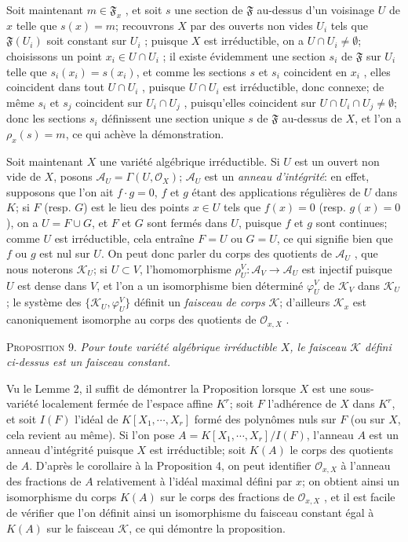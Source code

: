 Soit maintenant $m \in \mathfrak{F}_x$ , et soit $s$ une section de $\mathfrak{F}$ au-dessus d'un voisinage $U$ de $x$ telle que $s(x) = m$; recouvrons $X$ par des ouverts non vides $U_i$ tels que $\mathfrak{F}(U_i)$ soit constant sur $U_i$ ; puisque $X$ est irréductible, on a $U \cap U_i \neq \emptyset$; choisissons un point $x_i \in U \cap U_i$ ; il existe évidemment une section $s_i$ de $\mathfrak{F}$ sur $U_i$ telle que $s_i(x_i) = s(x_i)$, et comme les sections $s$ et $s_i$ coincident en $x_i$ , elles coincident dans tout $U \cap U_i$ , puisque $U \cap U_i$ est irréductible, donc connexe; de même $s_i$ et $s_j$ coincident sur $U_i \cap U_j$ , puisqu'elles coincident sur $U \cap U_i \cap U_j \neq \emptyset$; donc les sections $s_i$ définissent une section unique $s$ de $\mathfrak{F}$ au-dessus de $X$, et l'on a $\rho_x(s) = m$, ce qui achève la démonstration.

Soit maintenant $X$ une variété algébrique irréductible. Si $U$ est un ouvert non vide de $X$, posons $\mathcal{A}_U = \Gamma(U, \mathcal{O}_X)$; $\mathcal{A}_U$ est un \textit{anneau d'intégrité}: en effet, supposons que l'on ait $f \cdot g = 0$, $f$ et $g$ étant des applications régulières de $U$ dans $K$; si $F$ (resp. $G$) est le lieu des points $x \in U$ tels que $f(x) = 0$ (resp. $g(x) = 0$), on a $U = F \cup G$, et $F$ et $G$ sont fermés dans $U$, puisque $f$ et $g$ sont continues; comme $U$ est irréductible, cela entraîne $F = U$ ou $G = U$, ce qui signifie bien que $f$ ou $g$ est nul sur $U$. On peut donc parler du corps des quotients de $\mathcal{A}_U$ , que nous noterons $\mathcal{K}_U$; si $U \subset V$, l'homomorphisme $\rho_U^V\colon \mathcal{A}_V \to \mathcal{A}_U$ est injectif puisque $U$ est dense dans $V$, et l'on a un isomorphisme bien déterminé $\varphi_U^V$ de $\mathcal{K}_V$ dans $\mathcal{K}_U$ ; le système des $\{\mathcal{K}_U , \varphi_U^V\}$ définit un \textit{faisceau de corps} $\mathcal{K}$; d'ailleurs $\mathcal{K}_x$ est canoniquement isomorphe au corps des quotients de $\mathcal{O}_{x,X}$ .

\textsc{Proposition} 9. \textit{Pour toute variété algébrique irréductible $X$, le faisceau $\mathcal{K}$ défini ci-dessus est un faisceau constant.}

Vu le Lemme 2, il suffit de démontrer la Proposition lorsque $X$ est une sous-variété localement fermée de l'espace affine $K^r$; soit $F$ l'adhérence de $X$ dans $K^r$, et soit $I(F)$ l'idéal de $K[X_1 , \cdots , X_r]$ formé des polynômes nuls sur $F$ (ou sur $X$, cela revient au même). Si l'on pose $A = K[X_1 , \cdots , X_r]/I(F)$, l'anneau $A$ est un anneau d'intégrité puisque $X$ est irréductible; soit $K(A)$ le corps des quotients de $A$. D'après le corollaire à la Proposition 4, on peut identifier $\mathcal{O}_{x,X}$
à l'anneau des fractions de $A$ relativement à l'idéal maximal défini par $x$; on obtient ainsi un isomorphisme du corps $K(A)$ sur le corps des fractions de $\mathcal{O}_{x,X}$ , et il est facile de vérifier que l'on définit ainsi un isomorphisme du faisceau constant égal à $K(A)$ sur le faisceau $\mathcal{K}$, ce qui démontre la proposition.

